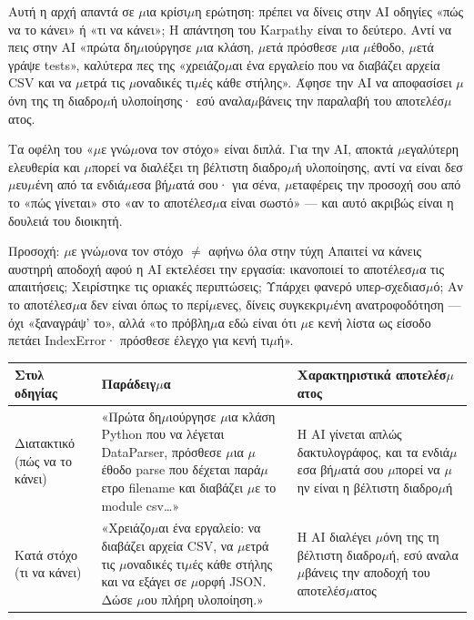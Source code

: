 
Αυτή η αρχή απαντά σε $\mu$ια κρίσι$\mu$η ερώτηση: πρέπει να δίνεις στην AI οδηγίες «πώς να το κάνει» ή «τι να κάνει»; Η απάντηση του Karpathy είναι το δεύτερο. Αντί να πεις στην AI «πρώτα δη$\mu$ιούργησε $\mu$ια κλάση, $\mu$ετά πρόσθεσε $\mu$ια $\mu$έθοδο, $\mu$ετά γράψε tests», καλύτερα πες της «χρειάζο$\mu$αι ένα εργαλείο που να διαβάζει αρχεία CSV και να $\mu$ετρά τις $\mu$οναδικές τι$\mu$ές κάθε στήλης». Άφησε την AI να αποφασίσει $\mu$όνη της τη διαδρο$\mu$ή υλοποίησης· εσύ αναλα$\mu$βάνεις την παραλαβή του αποτελέσ$\mu$ατος.

Τα οφέλη του «$\mu$ε γνώ$\mu$ονα τον στόχο» είναι διπλά. Για την AI, αποκτά $\mu$εγαλύτερη ελευθερία και $\mu$πορεί να διαλέξει τη βέλτιστη διαδρο$\mu$ή υλοποίησης, αντί να είναι δεσ$\mu$ευ$\mu$ένη από τα ενδιά$\mu$εσα βή$\mu$ατά σου· για σένα, $\mu$εταφέρεις την προσοχή σου από το «πώς γίνεται» στο «αν το αποτέλεσ$\mu$α είναι σωστό» — και αυτό ακριβώς είναι η δουλειά του διοικητή.

\begin{tcbwarn}{Προσοχή: $\mu$ε γνώ$\mu$ονα τον στόχο $\neq$ αφήνω όλα στην τύχη}
Απαιτεί να κάνεις αυστηρή αποδοχή αφού η AI εκτελέσει την εργασία: ικανοποιεί το αποτέλεσ$\mu$α τις απαιτήσεις; Χειρίστηκε τις οριακές περιπτώσεις; Υπάρχει φανερό υπερ-σχεδιασ$\mu$ό; Αν το αποτέλεσ$\mu$α δεν είναι όπως το περί$\mu$ενες, δίνεις συγκεκρι$\mu$ένη ανατροφοδότηση — όχι «ξαναγράψ' το», αλλά «το πρόβλη$\mu$α εδώ είναι ότι $\mu$ε κενή λίστα ως είσοδο πετάει IndexError· πρόσθεσε έλεγχο για κενή τι$\mu$ή».

\end{tcbwarn}

\begin{center}
\begin{tabularx}{\linewidth}{|X|X|X|}
\hline
\textbf{Στυλ οδηγίας} & \textbf{Παράδειγ$\mu$α} & \textbf{Χαρακτηριστικά αποτελέσ$\mu$ατος} \tabularnewline
\hline
Διατακτικό (πώς να το κάνει) & «Πρώτα δη$\mu$ιούργησε $\mu$ια κλάση Python που να λέγεται DataParser, πρόσθεσε $\mu$ια $\mu$έθοδο parse που δέχεται παρά$\mu$ετρο filename και διαβάζει $\mu$ε το module csv…» & Η AI γίνεται απλώς δακτυλογράφος, και τα ενδιά$\mu$εσα βή$\mu$ατά σου $\mu$πορεί να $\mu$ην είναι η βέλτιστη διαδρο$\mu$ή \tabularnewline
Κατά στόχο (τι να κάνει) & «Χρειάζο$\mu$αι ένα εργαλείο: να διαβάζει αρχεία CSV, να $\mu$ετρά τις $\mu$οναδικές τι$\mu$ές κάθε στήλης και να εξάγει σε $\mu$ορφή JSON. Δώσε $\mu$ου πλήρη υλοποίηση.» & Η AI διαλέγει $\mu$όνη της τη βέλτιστη διαδρο$\mu$ή, εσύ αναλα$\mu$βάνεις την αποδοχή του αποτελέσ$\mu$ατος \tabularnewline
\hline
\end{tabularx}
\end{center}

